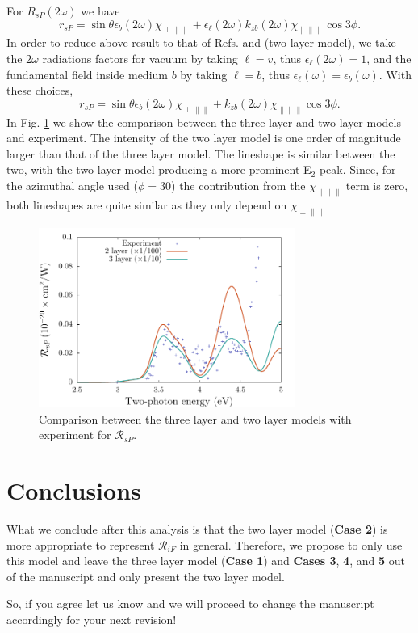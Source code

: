\documentclass{article}
\begin{document}
For $R_{sP}(2\omega)$ we have
\begin{equation}
r_{sP}
= \sin\theta\epsilon_{b}(2\omega)\chi_{\perp\parallel\parallel}
+ \epsilon_{\ell}(2\omega)k_{zb}(2\omega)
  \chi_{\parallel\parallel\parallel}\cos3\phi.
\end{equation}
In order to reduce above result to that of Refs. \cite{sipePRB87} and
\cite{mizrahiJOSA88} (two layer model), we take the $2\omega$ radiations factors
for vacuum by taking $\ell=v$, thus $\epsilon_{\ell}(2\omega)=1$, and the
fundamental field inside medium $b$ by taking $\ell=b$, thus
$\epsilon_{\ell}(\omega)=\epsilon_{b}(\omega)$. With these choices,
\begin{equation*}
r_{sP} = \sin\theta\epsilon_{b}(2\omega)\chi_{\perp\parallel\parallel}
+ k_{zb}(2\omega)\chi_{\parallel\parallel\parallel}\cos3\phi.
\end{equation*} 
In Fig. \ref{rsp} we show the comparison between the three layer and two layer
models and experiment. The intensity of the two layer model is one order of
magnitude larger than that of the three layer model. The lineshape is similar
between the two, with the two layer model producing a more prominent E$_{2}$
peak. Since, for the azimuthal angle used ($\phi = 30$) the contribution from
the $\chi_{\parallel\parallel\parallel}$ term is zero, both lineshapes are quite
similar as they only depend on $\chi_{\perp\parallel\parallel}$

\begin{figure}[t]
\centering
\includegraphics[width=0.75\textwidth]{figures/rsp}
\caption{Comparison between the three layer and two layer models with
experiment for $\mathcal{R}_{sP}$.}
\label{rsp}
\end{figure}


\section{Conclusions}

What we conclude after this analysis is that the two layer model (\textbf{Case
2}) is more appropriate to represent $\mathcal{R}_{iF}$ in general. Therefore,
we propose to only use this model and leave the three layer model (\textbf{Case
1}) and \textbf{Cases 3}, \textbf{4}, and \textbf{5} out of the manuscript and
only present the two layer model.

So, if you agree let us know and we will proceed to change the manuscript
accordingly for your next revision!




\end{document}
